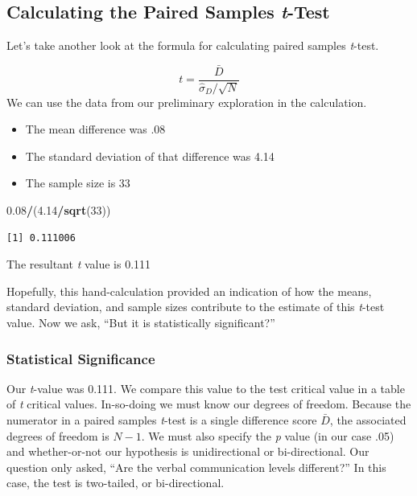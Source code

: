 \documentclass[
  11pt,
]{book}
\newenvironment{Shaded}{\begin{snugshade}}{\end{snugshade}}
\newcommand{\DecValTok}[1]{\textcolor[rgb]{0.06,0.06,0.06}{#1}}
\newcommand{\FloatTok}[1]{\textcolor[rgb]{0.06,0.06,0.06}{#1}}
\newcommand{\FunctionTok}[1]{\textcolor[rgb]{0.27,0.27,0.27}{\textbf{#1}}}
\newcommand{\NormalTok}[1]{#1}
\newcommand{\SpecialCharTok}[1]{\textcolor[rgb]{0.43,0.43,0.43}{\textbf{#1}}}
\providecommand{\tightlist}{%
  \setlength{\itemsep}{0pt}\setlength{\parskip}{0pt}}
\begin{document}
\hypertarget{calculating-the-paired-samples-t-test}{%
\subsection{\texorpdfstring{Calculating the Paired Samples \emph{t}-Test}{Calculating the Paired Samples t-Test}}\label{calculating-the-paired-samples-t-test}}

Let's take another look at the formula for calculating paired samples \emph{t}-test.

\[t = \frac{\bar{D}}{\hat\sigma_D / \sqrt{N}}\] We can use the data from our preliminary exploration in the calculation.

\begin{itemize}
\tightlist
\item
  The mean difference was .08
\item
  The standard deviation of that difference was 4.14
\item
  The sample size is 33
\end{itemize}

\begin{Shaded}
\begin{Highlighting}[]
\FloatTok{0.08}\SpecialCharTok{/}\NormalTok{(}\FloatTok{4.14}\SpecialCharTok{/}\FunctionTok{sqrt}\NormalTok{(}\DecValTok{33}\NormalTok{))}
\end{Highlighting}
\end{Shaded}

\begin{verbatim}
[1] 0.111006
\end{verbatim}

The resultant \emph{t} value is 0.111

Hopefully, this hand-calculation provided an indication of how the means, standard deviation, and sample sizes contribute to the estimate of this \emph{t}-test value. Now we ask, ``But it is statistically significant?''

\hypertarget{statistical-significance-2}{%
\subsubsection{Statistical Significance}\label{statistical-significance-2}}

Our \emph{t}-value was 0.111. We compare this value to the test critical value in a table of \emph{t} critical values. In-so-doing we must know our degrees of freedom. Because the numerator in a paired samples \emph{t}-test is a single difference score \(\bar{D}\), the associated degrees of freedom is \(N-1\). We must also specify the \emph{p} value (in our case .05) and whether-or-not our hypothesis is unidirectional or bi-directional. Our question only asked, ``Are the verbal communication levels different?'' In this case, the test is two-tailed, or bi-directional.
\end{document}
